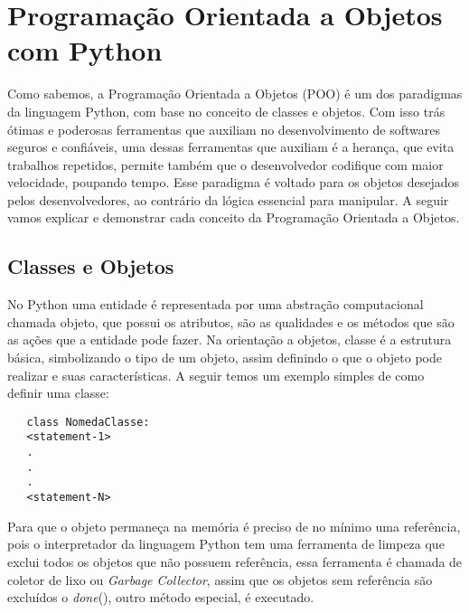 

\chapter{ Programação Orientada a Objetos com Python}

	 Como sabemos, a Programação Orientada a Objetos (POO) é um dos paradigmas da linguagem Python, com base no conceito de classes e objetos. Com isso trás ótimas e poderosas ferramentas que auxiliam no desenvolvimento de softwares seguros e confiáveis, uma dessas ferramentas que auxiliam é a herança, que evita trabalhos repetidos, permite também que o desenvolvedor codifique com maior velocidade, poupando tempo. Esse paradigma é voltado para os objetos desejados pelos desenvolvedores, ao contrário da lógica essencial para manipular. A seguir vamos explicar e demonstrar cada conceito da Programação Orientada a Objetos.

    \section{Classes e Objetos}
    
	 No Python uma entidade é representada por uma abstração computacional chamada objeto, que possui os atributos, são as qualidades e os métodos que são as ações que a entidade pode fazer. Na orientação a objetos, classe é a estrutura básica, simbolizando o tipo de um objeto, assim definindo o que o objeto pode realizar e suas características. A seguir temos um exemplo simples de como definir uma classe:
	 \begin{lstlisting}
   class NomedaClasse:
   <statement-1>
   .
   .
   .
   <statement-N>
	 \end{lstlisting}
	  
	 Para que o objeto permaneça na memória é preciso de no mínimo uma referência, pois o interpretador da linguagem Python tem uma ferramenta de limpeza que exclui todos os objetos que não possuem referência, essa ferramenta é chamada de coletor de lixo ou \textit{Garbage Collector}, assim que os objetos sem referência são excluídos o \textunderscore\textunderscore \textit{done}\textunderscore\textunderscore(), outro método especial, é executado.
	 
